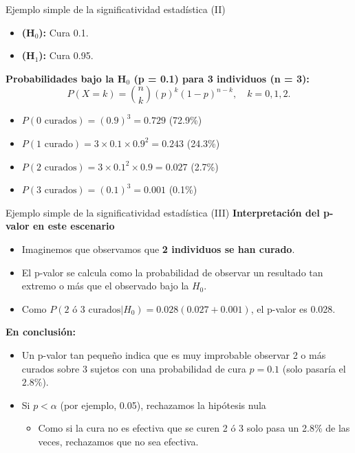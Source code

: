﻿\documentclass{beamer}
\begin{document}
\begin{frame}{Ejemplo simple de la significatividad estadística (II)}
\begin{itemize}
    \item \textbf{(H$_0$):} Cura 0.1.
    \item \textbf{(H$_1$):} Cura 0.95.
\end{itemize}

\vspace{0.3cm}
\textbf{Probabilidades bajo la H$_0$ (p = 0.1) para 3 individuos (n = 3):}
\[
P(X = k) = \binom{n}{k} (p)^k (1 - p)^{n-k},\quad k = 0,1,2.
\]
\begin{itemize}
    \item $P(\text{0 curados}) = (0.9)^3 = 0.729$ (72.9\%)
    \item $P(\text{1 curado}) = 3\times0.1\times0.9^2 = 0.243$ (24.3\%)
    \item $P(\text{2 curados}) = 3\times0.1^2\times0.9 = 0.027$ (2.7\%)
    \item $P(\text{3 curados}) = (0.1)^3 = 0.001$ (0.1\%)
\end{itemize}
\end{frame}

\begin{frame}{Ejemplo simple de la significatividad estadística (III)}
\textbf{Interpretación del p-valor en este escenario}
\begin{itemize}
    \item Imaginemos que observamos que \textbf{2 individuos se han curado}.
    \item El p-valor se calcula como la probabilidad de observar un resultado tan extremo o más que el observado bajo la $H_0$.
    \item  Como $P(2\text{ ó 3 curados}|H_0) = 0.028 (0.027+0.001)$, el p-valor es 0.028.
\end{itemize}
\textbf{En conclusión:}
\begin{itemize}
    \item Un p-valor tan pequeño indica que es muy improbable observar 2 o más curados sobre 3 sujetos con una probabilidad de cura $p = 0.1$ (solo pasaría el $2.8\%$).
    \item Si $p<\alpha$ (por ejemplo, 0.05), rechazamos la hipótesis nula 
    \begin{itemize}
        \item Como si la cura no es efectiva que se curen 2 ó 3 solo pasa un 2.8\% de las veces, rechazamos que no sea efectiva.
    \end{itemize}
\end{itemize}
\end{frame}
\end{document}
